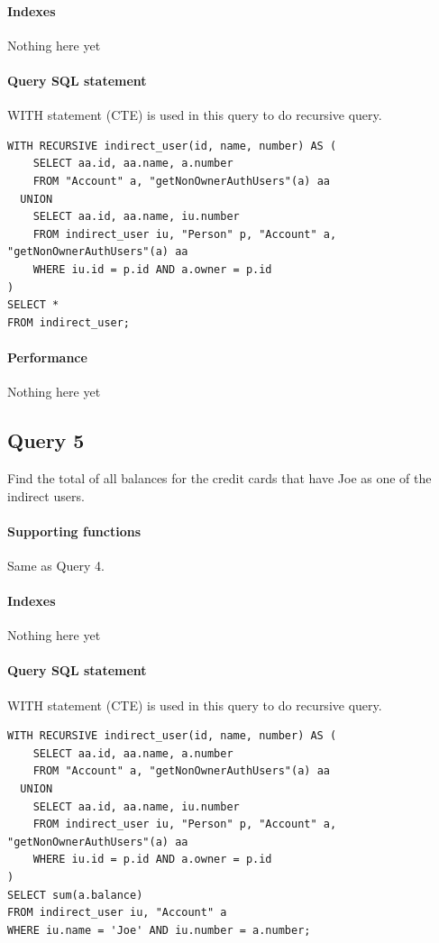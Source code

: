\documentclass[11pt]{article}
\begin{document}
\paragraph{Indexes} Nothing here yet

\paragraph{Query SQL statement} WITH statement (CTE) is used in this query to do recursive query.
\begin{verbatim}
WITH RECURSIVE indirect_user(id, name, number) AS (
    SELECT aa.id, aa.name, a.number
    FROM "Account" a, "getNonOwnerAuthUsers"(a) aa
  UNION
    SELECT aa.id, aa.name, iu.number
    FROM indirect_user iu, "Person" p, "Account" a, "getNonOwnerAuthUsers"(a) aa
    WHERE iu.id = p.id AND a.owner = p.id
)
SELECT *
FROM indirect_user;
\end{verbatim}

\paragraph{Performance} Nothing here yet

\subsection{Query 5}
Find the total of all balances for the credit cards that have Joe as one of the indirect users.

\paragraph{Supporting functions} Same as Query 4.

\paragraph{Indexes} Nothing here yet

\paragraph{Query SQL statement} WITH statement (CTE) is used in this query to do recursive query.
\begin{verbatim}
WITH RECURSIVE indirect_user(id, name, number) AS (
    SELECT aa.id, aa.name, a.number
    FROM "Account" a, "getNonOwnerAuthUsers"(a) aa
  UNION
    SELECT aa.id, aa.name, iu.number
    FROM indirect_user iu, "Person" p, "Account" a, "getNonOwnerAuthUsers"(a) aa
    WHERE iu.id = p.id AND a.owner = p.id
)
SELECT sum(a.balance)
FROM indirect_user iu, "Account" a
WHERE iu.name = 'Joe' AND iu.number = a.number;
\end{verbatim}
\end{document}
